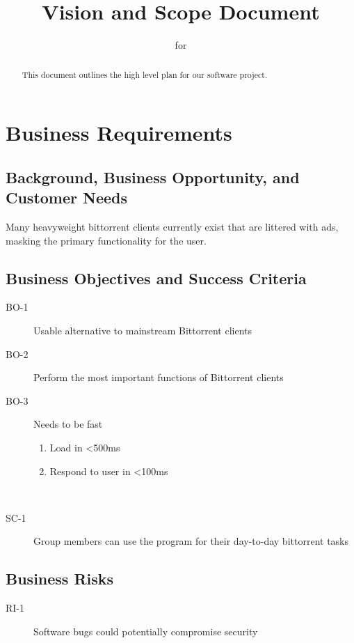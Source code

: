\documentclass[letter]{scrartcl}
\newcommand{\app}{\sc{393torrent}}
\begin{document}
\title{Vision and Scope Document}
\subtitle{for \app}
\date{} %

\maketitle

\begin{abstract}
This document outlines the high level plan for our software project.
\end{abstract}

\tableofcontents
\pagebreak

\section{Business Requirements}
\subsection{Background, Business Opportunity, and Customer Needs}
Many heavyweight bittorrent clients currently exist that are littered with ads, masking the primary functionality for the user.

\subsection{Business Objectives and Success Criteria}
\begin{description}
\item[BO-1] Usable alternative to mainstream Bittorrent clients
\item[BO-2] Perform the most important functions of Bittorrent clients
\item[BO-3] Needs to be fast 
\begin{enumerate}
  \item Load in \textless500ms
  \item Respond to user in \textless100ms
\end{enumerate}
\\
\item[SC-1] Group members can use the program for their day-to-day bittorrent tasks
\end{description}

\subsection{Business Risks}
\begin{description}
\item[RI-1] Software bugs could potentially compromise security
\end{description}
\end{document}
